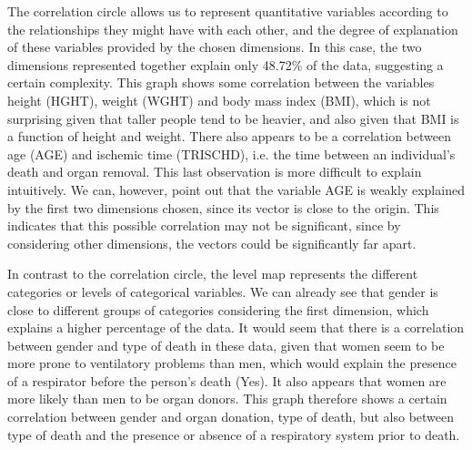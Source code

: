 \documentclass[a4paper, 11pt]{article}
\begin{document}
\begin{multicols}{2}
The correlation circle allows us to represent quantitative variables according to the relationships they might have with each other, and the degree of explanation of these variables provided by the chosen dimensions. 
In this case, the two dimensions represented together explain only 48.72\% of the data, suggesting a certain complexity. 
This graph shows some correlation between the variables height (HGHT), weight (WGHT) and body mass index (BMI), which is not surprising given that taller people tend to be heavier, and also given that BMI is a function of height and weight. 
There also appears to be a correlation between age (AGE) and ischemic time (TRISCHD), i.e. the time between an individual's death and organ removal. 
This last observation is more difficult to explain intuitively. 
We can, however, point out that the variable AGE is weakly explained by the first two dimensions chosen, since its vector is close to the origin. 
This indicates that this possible correlation may not be significant, since by considering other dimensions, the vectors could be significantly far apart.

In contrast to the correlation circle, the level map represents the different categories or levels of categorical variables. 
We can already see that gender is close to different groups of categories considering the first dimension, which explains a higher percentage of the data. 
It would seem that there is a correlation between gender and type of death in these data, given that women seem to be more prone to ventilatory problems than men, which would explain the presence of a respirator before the person's death (Yes). 
It also appears that women are more likely than men to be organ donors. This graph therefore shows a certain correlation between gender and organ donation, type of death, but also between type of death and the presence or absence of a respiratory system prior to death.


\end{multicols}
\end{document}

